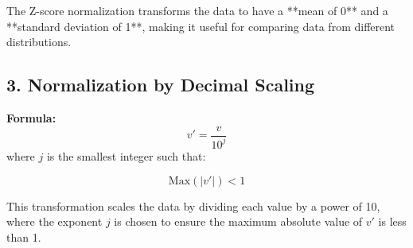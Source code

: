 \documentclass[a4paper,10pt]{article}
\begin{document}
The Z-score normalization transforms the data to have a **mean of 0** and a **standard deviation of 1**, making it useful for comparing data from different distributions.

\vspace{0.5cm}

\subsection*{3. Normalization by Decimal Scaling}

\textbf{Formula:}
\[
v' = \frac{v}{10^j}
\]
where \( j \) is the smallest integer such that:

\[
\text{Max}\left(|v'|\right) < 1
\]

This transformation scales the data by dividing each value by a power of 10, where the exponent \( j \) is chosen to ensure the maximum absolute value of \( v' \) is less than 1.

\vspace{0.5cm}
\end{document}
